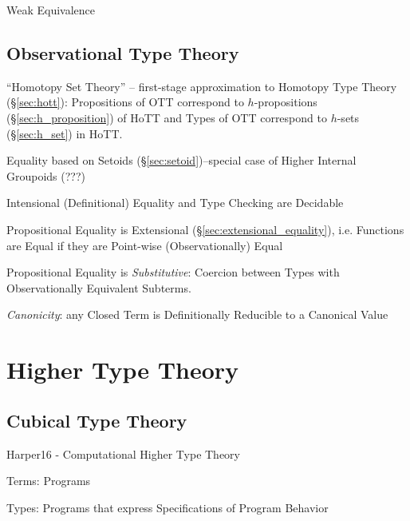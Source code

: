 Weak Equivalence



\subsection{Observational Type Theory}\label{sec:observational_type}

``Homotopy Set Theory'' -- first-stage approximation to Homotopy Type
Theory (\S\ref{sec:hott}): Propositions of OTT correspond to
$h$-propositions (\S\ref{sec:h_proposition}) of HoTT and Types of OTT
correspond to $h$-sets (\S\ref{sec:h_set}) in HoTT.

Equality based on Setoids (\S\ref{sec:setoid})--special case of Higher
Internal Groupoids (???)

Intensional (Definitional) Equality and Type Checking are Decidable

Propositional Equality is Extensional
(\S\ref{sec:extensional_equality}), i.e. Functions are Equal if they
are Point-wise (Observationally) Equal

Propositional Equality is \emph{Substitutive}: Coercion between Types
with Observationally Equivalent Subterms.

\emph{Canonicity}: any Closed Term is Definitionally Reducible to a
Canonical Value



\section{Higher Type Theory}\label{sec:higher_type_theory}

\subsection{Cubical Type Theory}\label{sec:cubical_type_theory}

Harper16 - Computational Higher Type Theory

Terms: Programs

Types: Programs that express Specifications of Program Behavior

